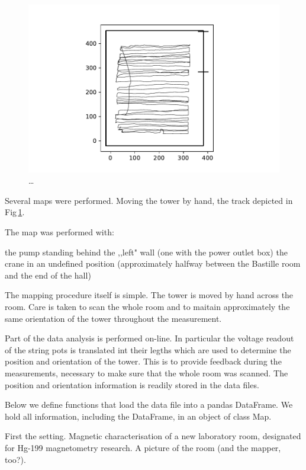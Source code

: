 \begin{figure}
  \centering
  \includegraphics[width=0.9\linewidth]{gfx/mapping/lpsc/bastille_crane_away_rep_track.pdf}
  \caption{\ldots}
  \label{fig:mapping_bastille_track}
\end{figure}

Several maps were performed. Moving the tower by hand, the track depicted in Fig\,\ref{fig:mapping_bastille_track}.

The map was performed with:

    the pump standing behind the ,,left" wall (one with the power outlet box)
    the crane in an undefined position (approximately halfway between the Bastille room and the end of the hall)

The mapping procedure itself is simple. The tower is moved by hand across the room. Care is taken to scan the whole room and to maitain approximately the same orientation of the tower throughout the measurement.

Part of the data analysis is performed on-line. In particular the voltage readout of the string pots is translated int their legths which are used to determine the position and orientation of the tower. This is to provide feedback during the measurements, necessary to make sure that the whole room was scanned. The position and orientation information is readily stored in the data files.

Below we define functions that load the data file into a pandas DataFrame. We hold all information, including the DataFrame, in an object of class Map.



First the setting. Magnetic characterisation of a new laboratory room, designated for Hg-199 magnetometry research.
A picture of the room (and the mapper, too?).

